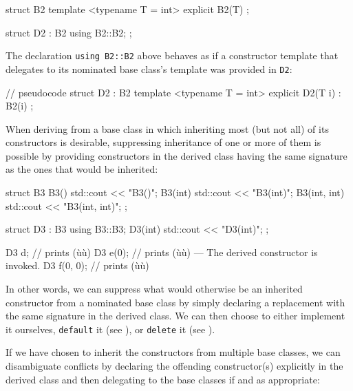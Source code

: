 \begin{emcppslisting}[language=C++]
struct B2
{
    template <typename T = int>
    explicit B2(T) { }
};

struct D2 : B2 { using B2::B2; };
\end{emcppslisting}
    
\noindent The declaration \lstinline!using!~\lstinline!B2::B2! above behaves as if a
constructor template that delegates to its nominated base class's
template was provided in \lstinline!D2!:

\begin{emcppslisting}[language=C++]
// pseudocode
struct D2 : B2
{
    template <typename T = int>
    explicit D2(T i) : B2(i) { }
};
\end{emcppslisting}
    
\noindent When deriving from a base class in which inheriting most
(but not all) of its constructors is desirable, suppressing
inheritance of one or more of them is possible by providing constructors in the
derived class having the same signature as the ones that would be
inherited:

\begin{emcppslisting}[language=C++]
struct B3
{
    B3()         { std::cout << "B3()\n"; }
    B3(int)      { std::cout << "B3(int)\n"; }
    B3(int, int) { std::cout << "B3(int, int)\n"; }
};

struct D3 : B3
{
    using B3::B3;
    D3(int) { std::cout << "D3(int)\n"; }
};

D3 d;        // prints (ù{}ù)
D3 e(0);     // prints (ù{}ù) --- The derived constructor is invoked.
D3 f(0, 0);  // prints (ù{}ù)
\end{emcppslisting}
    
\noindent In other words, we can suppress what would otherwise be an inherited
constructor from a nominated base class by simply declaring a
replacement with the same signature in the derived class. We can then
choose to either implement it ourselves, \lstinline!default! it (see ), 
or \lstinline!delete! it (see ). 

If we have chosen to inherit the constructors from multiple
base classes, we can disambiguate conflicts by declaring the offending
constructor(s) explicitly in the derived class and then delegating to
the base classes if and as appropriate:

